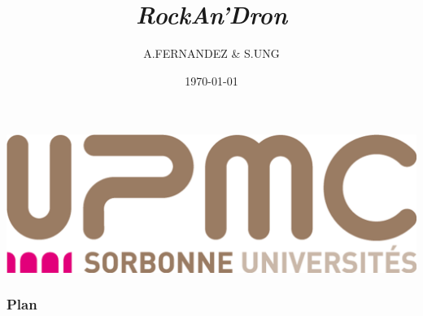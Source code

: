 \documentclass{beamer}
\title{\textit{RockAn’Dron}}
\author{A.FERNANDEZ \& S.UNG}
\institute{Projet STL}
\date{\today}
\begin{document}
\begin{frame}
\titlepage
\begin{center}
\includegraphics[scale=0.05]{images/logo_upmc.jpg}
\end{center}
\end{frame}

\begin{frame}
\frametitle{Plan}
\setcounter{tocdepth}{1}
\tableofcontents
\end{frame}





\end{document}
